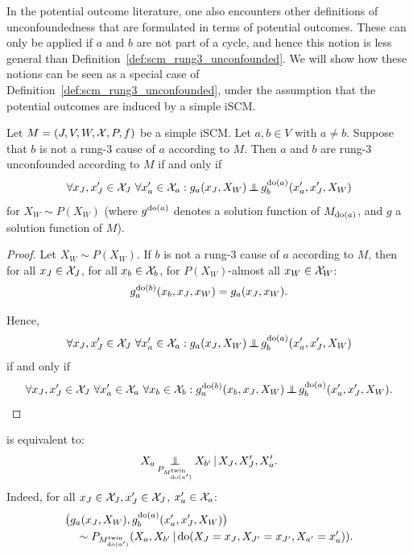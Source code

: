 In the potential outcome literature, one also encounters other definitions of unconfoundedness that are formulated in terms of potential outcomes.
These can only be applied if $a$ and $b$ are not part of a cycle, and hence this notion is less general than Definition~\ref{def:scm_rung3_unconfounded}.
We will show how these notions can be seen as a special case of Definition~\ref{def:scm_rung3_unconfounded}, under the assumption that the potential outcomes are induced by a simple iSCM.
\begin{Prp}\label{prp:scm_rung3_unconfounded_acyclic}
  Let $M = \left ( J, V, W, \mathcal{X}, P, f \right )$ be a simple iSCM.
  Let $a, b \in V$ with $a \ne b$.
  Suppose that $b$ is not a rung-3 cause of $a$ according to $M$.
  Then $a$ and $b$ are rung-3 unconfounded according to $M$ if and only if
  \begin{equation}\label{eq:scm_rung3_unconfounded_acyclic}
    \forall x_J,x_{J}' \in \CX_J \ \forall x_{a}' \in \CX_a: g_a(x_J,X_W) \Indep g^{\doit(a)}_b(x_{a}',x_{J}',X_W)
  \end{equation}
  for $X_W \sim P(X_W)$ (where $g^{\operatorname{do}(a)}$ denotes a solution function of $M_{\operatorname{do}(a)}$, and $g$ a solution function of $M$).
\end{Prp}
\begin{proof}
  Let $X_W \sim P(X_W)$.
  If $b$ is not a rung-3 cause of $a$ according to $M$, then for all $x_J \in \mathcal{X}_J$, for all $x_b \in \mathcal{X}_b$, for $P(X_W)$-almost all $x_W \in \mathcal{X}_W$: 
  $$g^{\operatorname{do}(b)}_a(x_b,x_J,x_W) = g_a(x_J,x_W).$$

  Hence, 
  $$\forall x_J,x_{J}' \in \CX_J \ \forall x_{a}' \in \CX_a: g_a(x_J,X_W) \Indep g^{\doit(a)}_b(x_{a}',x_{J}',X_W)$$
  if and only if 
  $$\forall x_J,x_{J}' \in \mathcal{X}_J \ \forall x_{a}' \in \mathcal{X}_a \ \forall x_b \in \mathcal{X}_b: g^{\operatorname{do}(b)}_a(x_b,x_J,X_W) \operatorname*{\perp\mkern-11mu\perp} g^{\operatorname{do}(a)}_b(x_{a}',x_{J}',X_W).$$
\end{proof}
\begin{Rem}\label{rem:scm_rung3_unconfounded_acyclic}
   is equivalent to:
  $$X_a \operatorname*{\perp\mkern-11mu\perp}_{P_{M^{\mathrm{twin}}_{\operatorname{do}(a')}}} X_{b'} \operatorname*{|} X_J, X_{J}', X_{a}'.$$
  Indeed, for all $x_J \in \mathcal{X}_J, x_{J}' \in \mathcal{X}_J$, $x_{a}' \in \mathcal{X}_a$:
  \begin{equation*}\begin{split}
    & \big(g_a(x_J,X_W), g^{\operatorname{do}(a)}_b(x_{a}',x_{J}',X_W)\big) \\
    & \quad \sim P_{M^{\mathrm{twin}}_{\operatorname{do}(a')}}(X_a,X_{b'} \operatorname*{|} \operatorname{do}(X_J=x_J,X_{J'}=x_{J'},X_{a'}=x_{a}')).
  \end{split}\end{equation*}
\end{Rem}

